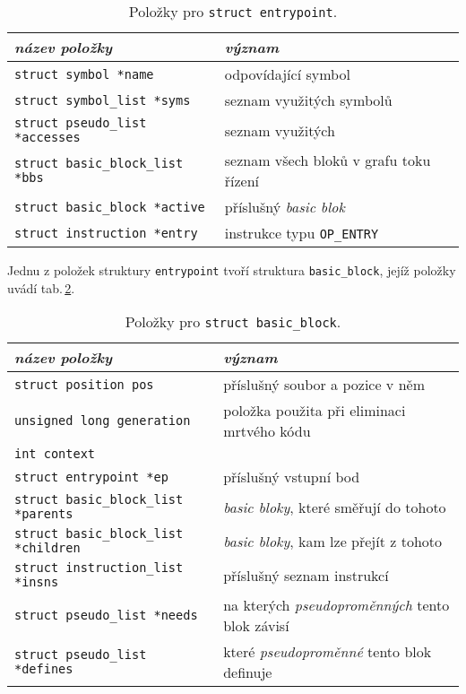 \begin{table}[!h]
    \begin{center}
        \begin{tabular}{|l|l|}
            \hline
            \textsl{název položky} & \textsl{význam} \\
            \hline
        	    \texttt{struct symbol *name} & odpovídající symbol \\
            	\texttt{struct symbol\_list *syms} & seznam využitých symbolů \\
            	\texttt{struct pseudo\_list *accesses} & seznam využitých \uv{pseudoproměnných} \\
             	\texttt{struct basic\_block\_list *bbs} & seznam všech bloků v grafu toku řízení \\
                \texttt{struct basic\_block *active} & příslušný \emph{basic blok} \\
                \texttt{struct instruction *entry} & instrukce typu \texttt{OP\_ENTRY} \\
            \hline
        \end{tabular}
        \caption{Položky pro \texttt{struct entrypoint}.}
        \label{tab:entrypoint}
    \end{center}
\end{table}

Jednu z položek struktury \texttt{entrypoint} tvoří struktura \texttt{basic\_block},
jejíž položky uvádí tab.\,\ref{tab:basicblock}.

\begin{table}[!h]
    \begin{center}
        \begin{tabular}{|l|l|}
            \hline
            \textsl{název položky} & \textsl{význam} \\
            \hline
            	\texttt{struct position pos} & příslušný soubor a pozice v něm \\
                \texttt{unsigned long generation} & položka použita při eliminaci mrtvého kódu \\
                \texttt{int context} & \\
                \texttt{struct entrypoint *ep} & příslušný vstupní bod \\
                \texttt{struct basic\_block\_list *parents} & \emph{basic bloky}, které směřují do tohoto\\
                \texttt{struct basic\_block\_list *children} & \emph{basic bloky}, kam lze přejít z tohoto \\
	            \texttt{struct instruction\_list *insns} & příslušný seznam instrukcí \\
	            \texttt{struct pseudo\_list *needs} & na kterých \emph{pseudoproměnných} tento blok závisí \\
                \texttt{struct pseudo\_list *defines} & které \emph{pseudoproměnné} tento blok definuje\\
            \hline
        \end{tabular}
        \caption{Položky pro \texttt{struct basic\_block}.}
        \label{tab:basicblock}
    \end{center}
\end{table}

